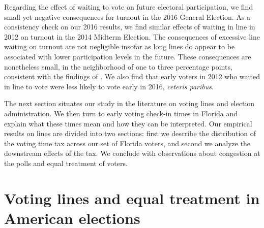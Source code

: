 \documentclass[12pt,titlepage]{article}
\begin{document}

Regarding the effect of waiting to vote on future electoral
participation, we find small yet negative consequences for turnout in
the 2016 General Election.  As a consistency check on our 2016
results, we find similar effects of waiting in line in 2012 on turnout
in the 2014 Midterm Election.  The consequences of excessive line
waiting on turnout are not negligible insofar as long lines do appear
to be associated with lower participation levels in the future.  These
consequences are nonetheless small, in the neighborhood of one to
three percentage points, consistent with the findings of
\citet{pettigrew:longlinesminorityprecincts}.  We also find that early
voters in 2012 who waited in line to vote were less likely to vote
early in 2016, \emph{ceteris paribus}.

The next section situates our study in the literature on voting lines
and election administration.  We then turn to early voting check-in
times in Florida and explain what these times mean and how they can be
interpreted.  Our empirical results on lines are divided into two
sections: first we describe the distribution of the voting time tax
across our set of Florida voters, and second we analyze the downstream
effects of the tax.  We conclude with observations about congestion at
the polls and equal treatment of voters.

\section*{Voting lines and equal treatment in American elections}
\end{document}
